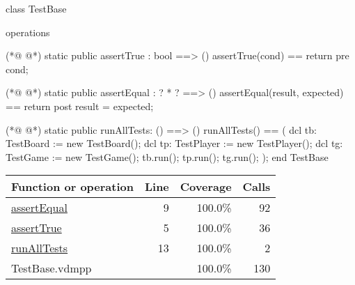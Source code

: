\begin{vdmpp}[breaklines=true]
class TestBase

operations
 
(*@
\label{assertTrue:5}
@*)
 static public assertTrue : bool ==> ()
  assertTrue(cond) == return
 pre cond;
  
(*@
\label{assertEqual:9}
@*)
 static public assertEqual : ? * ? ==> ()
  assertEqual(result, expected) == return
 post result = expected;
  
(*@
\label{runAllTests:13}
@*)
 static public runAllTests: () ==> ()
  runAllTests() == (
    dcl tb: TestBoard := new TestBoard();
    dcl tp: TestPlayer := new TestPlayer();
    dcl tg: TestGame := new TestGame();
    tb.run();
    tp.run();
    tg.run();
    );
end TestBase
\end{vdmpp}
\bigskip
\begin{longtable}{|l|r|r|r|}
\hline
Function or operation & Line & Coverage & Calls \\
\hline
\hline
\hyperref[assertEqual:9]{assertEqual} & 9&100.0\% & 92 \\
\hline
\hyperref[assertTrue:5]{assertTrue} & 5&100.0\% & 36 \\
\hline
\hyperref[runAllTests:13]{runAllTests} & 13&100.0\% & 2 \\
\hline
\hline
TestBase.vdmpp & & 100.0\% & 130 \\
\hline
\end{longtable}


